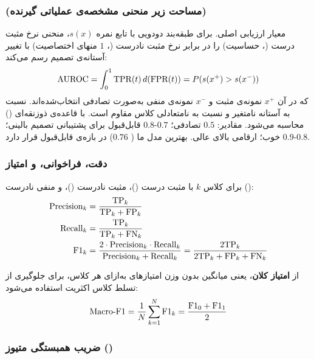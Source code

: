 \subsubsection{ (مساحت زیر منحنی مشخصه‌ی عملیاتی گیرنده)}

معیار ارزیابی اصلی. برای طبقه‌بند دودویی با تابع نمره $s(x)$، منحنی  نرخ مثبت درست (، حساسیت) را در برابر نرخ مثبت نادرست (، $1$ منهای اختصاصیت) با تغییر آستانه‌ی تصمیم رسم می‌کند:
\begin{equation}
\text{AUROC} = \int_0^1 \text{TPR}(t) \, d(\text{FPR}(t)) = P(s(x^+) > s(x^-))
\end{equation}
که در آن $x^+$ نمونه‌ی مثبت و $x^-$ نمونه‌ی منفی به‌صورت تصادفی انتخاب‌شده‌اند.  نسبت به آستانه نامتغیر و نسبت به نامتعادلی کلاس مقاوم است.  با قاعده‌ی ذوزنقه‌ای (\texttt{}) محاسبه می‌شود. مقادیر: $0.5$ تصادفی؛ $0.7$-$0.8$ قابل‌قبول برای پشتیبانی تصمیم بالینی؛ $0.8$-$0.9$ خوب؛ ارقامی بالای \mbox{} عالی. بهترین مدل ما ( $0.76$) در بازه‌ی قابل‌قبول قرار دارد.

\subsubsection{دقت، فراخوانی، و امتیاز }

برای کلاس $k$ با مثبت درست ()، مثبت نادرست ()، و منفی نادرست ():
\begin{align}
\text{Precision}_k &= \frac{\text{TP}_k}{\text{TP}_k + \text{FP}_k} \\
\text{Recall}_k &= \frac{\text{TP}_k}{\text{TP}_k + \text{FN}_k} \\
\text{F1}_k &= \frac{2 \cdot \text{Precision}_k \cdot \text{Recall}_k}{\text{Precision}_k + \text{Recall}_k} = \frac{2\text{TP}_k}{2\text{TP}_k + \text{FP}_k + \text{FN}_k}
\end{align}

از \textbf{امتیاز  کلان}، یعنی میانگین بدون وزن امتیازهای  به‌ازای هر کلاس، برای جلوگیری از تسلط کلاس اکثریت استفاده می‌شود:
\begin{equation}
\text{Macro-F1} = \frac{1}{N} \sum_{k=1}^{N} \text{F1}_k = \frac{\text{F1}_0 + \text{F1}_1}{2}
\end{equation}

\subsubsection{ضریب همبستگی متیوز ()}

